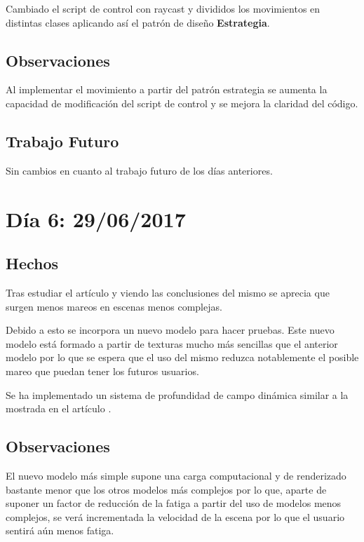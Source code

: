\documentclass[12pt,a4paper]{article}
\begin{document}
Cambiado el script de control con raycast y divididos los movimientos en distintas clases aplicando así el patrón de diseño \textbf{Estrategia}.

\subsection{Observaciones}

Al implementar el movimiento a partir del patrón estrategia se aumenta la capacidad de modificación del script de control y se mejora la claridad del código.

\subsection{Trabajo Futuro}

Sin cambios en cuanto al trabajo futuro de los días anteriores.

\section{Día 6: 29/06/2017}

\subsection{Hechos}

Tras estudiar el artículo \cite{Davis et al.} y viendo las conclusiones del mismo se aprecia que surgen menos mareos en escenas menos complejas.

Debido a esto se incorpora un nuevo modelo para hacer pruebas. Este nuevo modelo está formado a partir de texturas mucho más sencillas que el anterior modelo por lo que se espera que el uso del mismo reduzca notablemente el posible mareo que puedan tener los futuros usuarios.

Se ha implementado un sistema de profundidad de campo dinámica similar a la mostrada en el artículo \cite{Carnegie and Rhee}.

\subsection{Observaciones}

El nuevo modelo más simple supone una carga computacional y de renderizado bastante menor que los otros modelos más complejos por lo que, aparte de suponer un factor de reducción de la fatiga a partir del uso de modelos menos complejos, se verá incrementada la velocidad de la escena por lo que el usuario sentirá aún menos fatiga.
\end{document}
